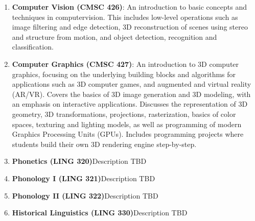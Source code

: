 \begin{enumerate}
\item \textbf{Computer Vision (CMSC 426)}: An introduction to basic concepts and techniques in computervision. This includes low-level operations such as image filtering and edge detection, 3D reconstruction of scenes using stereo and structure from motion, and object detection, recognition and classification.
\item \textbf{Computer Graphics (CMSC 427)}: An introduction to 3D computer graphics, focusing on the underlying building blocks and algorithms for applications such as 3D computer games, and augmented and virtual reality (AR/VR). Covers the basics of 3D image generation and 3D modeling, with an emphasis on interactive applications. Discusses the representation of 3D geometry, 3D transformations, projections, rasterization, basics of color spaces, texturing and lighting models, as well as programming of modern Graphics Processing Units (GPUs). Includes programming projects where students build their own 3D rendering engine step-by-step.
\item \textbf{Phonetics (LING 320)}Description TBD
\item \textbf{Phonology I (LING 321)}Description TBD
\item \textbf{Phonology II (LING 322)}Description TBD
\item \textbf{Historical Linguistics (LING 330)}Description TBD
\end{enumerate}
